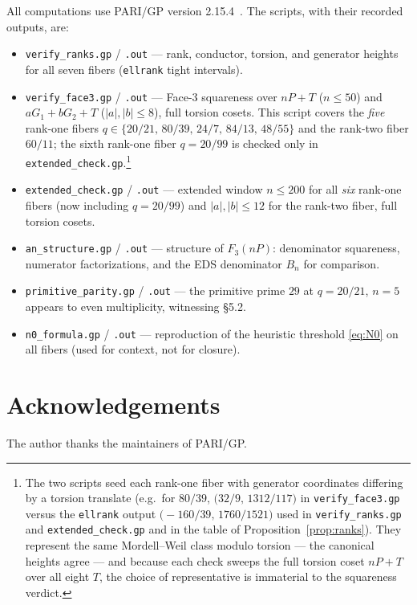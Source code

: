 \documentclass[11pt,reqno]{amsart}
\theoremstyle{plain}
\theoremstyle{definition}
\begin{document}
All computations use PARI/GP version 2.15.4~\cite{pari}. The scripts, with their
recorded outputs, are:
\begin{itemize}
\item \texttt{verify\_ranks.gp} / \texttt{.out} --- rank, conductor, torsion,
and generator heights for all seven fibers (\texttt{ellrank} tight intervals).
\item \texttt{verify\_face3.gp} / \texttt{.out} --- Face-3 squareness over
$nP+T$ ($n\le50$) and $aG_1+bG_2+T$ ($|a|,|b|\le8$), full torsion cosets. This
script covers the \emph{five} rank-one fibers
$q\in\{20/21,\,80/39,\,24/7,\,84/13,\,48/55\}$ and the rank-two fiber $60/11$;
the sixth rank-one fiber $q=20/99$ is checked only in
\texttt{extended\_check.gp}.\footnote{The two scripts seed each rank-one fiber
with generator coordinates differing by a torsion translate (e.g.\ for $80/39$,
$\bigl(32/9,\,1312/117\bigr)$ in \texttt{verify\_face3.gp} versus the
\texttt{ellrank} output $\bigl(-160/39,\,1760/1521\bigr)$ used in
\texttt{verify\_ranks.gp} and \texttt{extended\_check.gp} and in the table of
Proposition~\ref{prop:ranks}). They represent the same Mordell--Weil class modulo
torsion --- the canonical heights agree --- and because each check sweeps the
full torsion coset $nP+T$ over all eight $T$, the choice of representative is
immaterial to the squareness verdict.}
\item \texttt{extended\_check.gp} / \texttt{.out} --- extended window
$n\le200$ for all \emph{six} rank-one fibers (now including $q=20/99$) and
$|a|,|b|\le12$ for the rank-two fiber, full torsion cosets.
\item \texttt{an\_structure.gp} / \texttt{.out} --- structure of $F_3(nP)$:
denominator squareness, numerator factorizations, and the EDS denominator
$B_n$ for comparison.
\item \texttt{primitive\_parity.gp} / \texttt{.out} --- the primitive prime
$29$ at $q=20/21$, $n=5$ appears to even multiplicity, witnessing \S5.2.
\item \texttt{n0\_formula.gp} / \texttt{.out} --- reproduction of the heuristic
threshold \eqref{eq:N0} on all fibers (used for context, not for closure).
\end{itemize}

\section*{Acknowledgements}
The author thanks the maintainers of PARI/GP.
\end{document}
